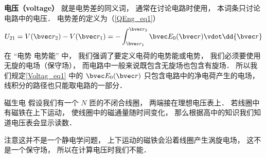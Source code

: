 

\textbf{电压（voltage）} 就是电势差的同义词， 通常在讨论电路时使用， 本词条只讨论电路中的电压． 电势差的定义为（\autoref{QEng_eq1}）
\begin{equation}\label{Voltag_eq1}
U_{21} = V(\bvec r_2) - V(\bvec r_1) = - \int_{\bvec r_1}^{\bvec r_2} \bvec E_0(\bvec r) \vdot \dd{\bvec r}
\end{equation}
在 “电势 电势能” 中， 我们强调了要定义电荷的电势能或电势， 我们必须要使用无旋的电场（保守场）， 而电路中一般来说既包含无旋场也包含有旋场． 所以我们规定\autoref{Voltag_eq1} 中的 $\bvec E_0(\bvec r)$ 只包含电路中的净电荷产生的电场， 线积分的路径也只能取电路的一部分．

\begin{exercise}{磁生电}
假设我们有一个 $N$ 匝的不闭合线圈， 两端接在理想电压表上． 若线圈中有磁铁在上下运动， 使线圈中的磁通量随时间变化， 那么根据高中的知识我们知道电压表会显示读数．

注意这并不是一个静电学问题， 上下运动的磁铁会沿着线圈产生涡旋电场， 这不是一个保守场， 所以在计算电压时我们不能．
\end{exercise}